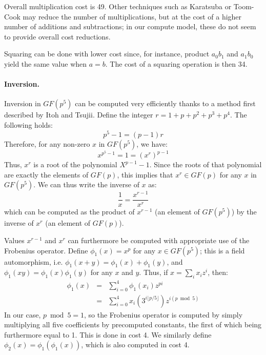 \documentclass{llncs}
\newcommand{\GF}{GF}
\begin{document}
Overall multiplication cost is 49. Other techniques such as Karatsuba
or Toom-Cook may reduce the number of multiplications, but at the cost
of a higher number of additions and subtractions; in our compute model,
these do not seem to provide overall cost reductions.

Squaring can be done with lower cost since, for instance, product $a_0 b_1$
and $a_1 b_0$ yield the same value when $a = b$. The cost of a squaring
operation is then 34.

\paragraph{Inversion.} Inversion in $\GF(p^5)$ can be computed very
efficiently thanks to a method first described by Itoh and
Tsujii\cite{ItoTsu1988}. Define the integer $r = 1 + p + p^2 + p^3 +
p^4$. The following holds:
\begin{equation*}
    p^5 - 1 = (p - 1) r
\end{equation*}
Therefore, for any non-zero $x$ in $\GF(p^5)$, we have:
\begin{equation*}
    x^{p^5-1} = 1 = (x^r)^{p-1}
\end{equation*}
Thus, $x^r$ is a root of the polynomial $X^{p-1}-1$. Since the roots of
that polynomial are exactly the elements of $\GF(p)$, this implies that
$x^r \in \GF(p)$ for any $x$ in $\GF(p^5)$. We can thus write the inverse
of $x$ as:
\begin{equation*}
    \frac{1}{x} = \frac{x^{r-1}}{x^r}
\end{equation*}
which can be computed as the product of $x^{r-1}$ (an element of $\GF(p^5)$)
by the inverse of $x^r$ (an element of $\GF(p)$).

Values $x^{r-1}$ and $x^r$ can furthermore be computed with appropriate
use of the Frobenius operator. Define $\phi_1(x) = x^p$ for any $x \in
\GF(p^5)$; this is a field automorphism, i.e. $\phi_1(x + y) = \phi_1(x)
+ \phi_1(y)$, and $\phi_1(xy) = \phi_1(x) \phi_1(y)$ for any $x$ and
$y$. Thus, if $x = \sum_i x_i z^i$, then:
\begin{eqnarray*}
    \phi_1(x) &=& \sum_{i=0}^4 \phi_1(x_i) z^{pi} \\
              &=& \sum_{i=0}^4 x_i (3^{i\lfloor p/5 \rfloor}) z^{i(p \bmod 5)}
\end{eqnarray*}
In our case, $p \bmod 5 = 1$, so the Frobenius operator is computed by
simply multiplying all five coefficients by precomputed constants, the
first of which being furthermore equal to 1. This is done in cost 4. We
similarly define $\phi_2(x) = \phi_1(\phi_1(x))$, which is also
computed in cost 4.
\end{document}
